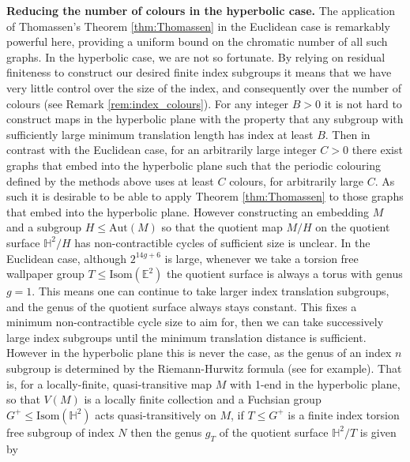 \documentclass{article}
\numberwithin{equation}{section}
\newcommand{\EE}{\mathbb{E}}
\newcommand{\HH}{\mathbb{H}}
\theoremstyle{definition}
\theoremstyle{remark}
\begin{document}



\textbf{Reducing the number of colours in the hyperbolic case.} The application of Thomassen's Theorem \ref{thm:Thomassen} in the Euclidean case is remarkably powerful here, providing a uniform bound on the chromatic number of all such graphs.
In the hyperbolic case, we are not so fortunate. By relying on residual finiteness to construct our desired finite index subgroups it means that we have very little control over the size of the index, and consequently over the number of colours (see Remark \ref{rem:index_colours}). 
For any integer $B>0$ it is not hard to construct maps in the hyperbolic plane with the property that any subgroup with sufficiently large minimum translation length has index at least $B$. Then in contrast with the Euclidean case, for an arbitrarily large integer $C>0$ there exist graphs that embed into the hyperbolic plane such that the periodic colouring defined by the methods above uses at least $C$ colours, for arbitrarily large $C$.
As such it is desirable to be able to apply Theorem \ref{thm:Thomassen} to those graphs that embed into the hyperbolic plane. However constructing an embedding $M$ and a subgroup $H\leq \text{Aut}(M)$ so that the quotient map $M/H$ on the quotient surface $\HH^2/H$ has non-contractible cycles of sufficient size is unclear.
In the Euclidean case, although $2^{14g+6}$ is large, whenever we take a torsion free wallpaper group $T\leq \text{Isom}(\EE^2)$ the quotient surface is always a torus with genus $g=1$. This means one can continue to take larger index translation subgroups, and the genus of the quotient surface always stays constant. This fixes a minimum non-contractible cycle size to aim for, then we can take successively large index subgroups until the minimum translation distance is sufficient.
However in the hyperbolic plane this is never the case, as the genus of an index $n$ subgroup is determined by the Riemann-Hurwitz formula (see \cite{Singerman1970} for example).
That is, for a locally-finite, quasi-transitive map $M$ with 1-end in the hyperbolic plane, so that $V(M)$ is a locally finite collection and a Fuchsian group $G^+\leq\text{Isom}(\HH^2)$ acts quasi-transitively on $M$, if $T\leq G^+$ is a finite index torsion free subgroup of index $N$ then the genus $g_T$ of the quotient surface $\HH^2/T$ is given by
\end{document}
